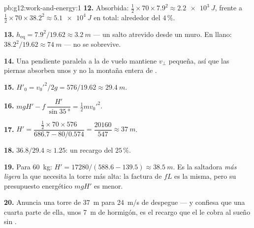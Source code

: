\begin{solution}{pb:g12:work-and-energy:1}
\textbf{12.} Absorbida: $\tfrac12 \times 70 \times 7.9^2 \approx
\qty{2.2e3}{J}$, frente a $\tfrac12 \times 70 \times 38.2^2 \approx
\qty{5.1e4}{J}$ en total: alrededor del $4\,\%$.

\textbf{13.} $h_{\text{eq}} = 7.9^2/19.62 \approx \qty{3.2}{m}$ --- un
salto atrevido desde un muro. En llano:
$38.2^2/19.62 \approx \qty{74}{m}$ --- no se sobrevive.

\textbf{14.} Una pendiente paralela a la  de vuelo mantiene
$v_\perp$ pequeña, así que las piernas absorben unos  y no la
montaña entera de .

\textbf{15.} $H'_0 = v_0'^2/2g = 576/19.62 \approx \qty{29.4}{m}$.

\textbf{16.} $mgH' - f\,\dfrac{H'}{\sin\qty{35}{\degree}} =
\tfrac12 m v_0'^2$.

\textbf{17.} $H' = \dfrac{\tfrac12 \times 70 \times 576}
{686.7 - 80/0.574} = \dfrac{\num{20160}}{547} \approx \qty{37}{m}$.

\textbf{18.} $36.8/29.4 \approx 1.25$: un recargo del $25\,\%$.

\textbf{19.} Para \qty{60}{kg}:
$H' = \num{17280}/(588.6 - 139.5) \approx \qty{38.5}{m}$. Es la
saltadora \emph{más ligera} la que necesita la torre más alta: la
factura de  $fL$ es la misma, pero su presupuesto energético
$mgH'$ es menor.

\textbf{20.} Anuncia una torre de \qty{37}{m} para \qty{24}{m/s} de
despegue --- y confiesa que una cuarta parte de ella, unos \qty{7}{m} de
hormigón, es el recargo que el  le cobra al sueño sin
.
\end{solution}
